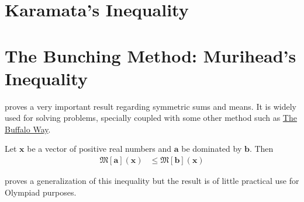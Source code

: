 \documentclass[inequalities.tex]{subfile}
\begin{document}
	\section[Karamata]{Karamata's Inequality}\label{sec:karamata}
	
	\section[Bunching: Murihead]{The Bunching Method: Murihead's Inequality}\label{sec:bunching}
	
	\textcite{muirhead_1902} proves a very important result regarding symmetric sums and means. It is widely used for solving problems, specially coupled with some other method such as \hyperref[ch:buffalo]{The Buffalo Way}.
		\begin{theorem}
			Let $\mathbf{x}$ be a vector of positive real numbers and $\mathbf{a}$ be dominated by $\mathbf{b}$. Then
				\begin{align*}
					\mathfrak{M}[\mathbf{a}](\mathbf{x})
						& \leq \mathfrak{M}[\mathbf{b}](\mathbf{x})
				\end{align*}
		\end{theorem}
	\textcite{paris_vencovska_2009} proves a generalization of this inequality but the result is of little practical use for Olympiad purposes.
		\begin{theorem}
			
		\end{theorem}
\end{document}
